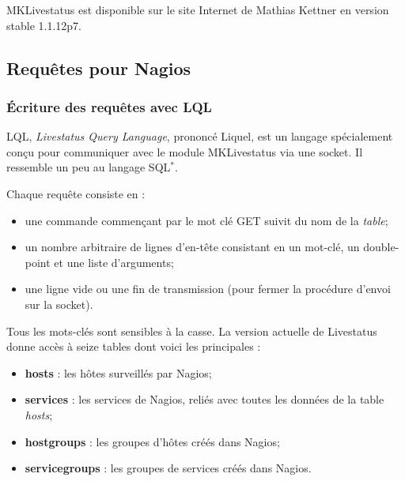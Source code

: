 \vspace{0.20cm}

MKLivestatus est disponible sur le site Internet\cite{biblio:siteMklivestatus} de Mathias Kettner en version stable 1.1.12p7.

\subsection{Requ\^etes pour Nagios}

\subsubsection{\'Ecriture des requ\^etes avec LQL}

LQL, \textit{Livestatus Query Language}, prononc\'e \og Liquel\fg, est un langage sp\'ecialement con\c{c}u pour communiquer avec le module MKLivestatus via une socket.
Il ressemble un peu au langage SQL$^*$.

\noindent Chaque requ\^ete consiste en :

\begin{itemize}
	\item une commande commen\c{c}ant par le mot cl\'e \textsf{GET} suivit du nom de la \textit{table};
	\item un nombre arbitraire de lignes d'en-t\^ete consistant en un mot-cl\'e, un double-point et une liste d'arguments;
	\item une ligne vide ou une fin de transmission (pour fermer la proc\'edure d'envoi sur la socket).

\end{itemize}

\vspace{0.20cm}

Tous les mots-cl\'es sont sensibles \`a la casse. 
La version actuelle de Livestatus donne acc\`es \`a seize tables dont voici les principales :

\begin{itemize}
	\item \textbf{hosts} : les h\^otes surveill\'es par Nagios;
	\item \textbf{services} : les services de Nagios, reli\'es avec toutes les donn\'ees de la table \textit{hosts};
	\item \textbf{hostgroups} : les groupes d'h\^otes cr\'e\'es dans Nagios;
	\item \textbf{servicegroups} : les groupes de services cr\'e\'es dans Nagios.

\end{itemize}

